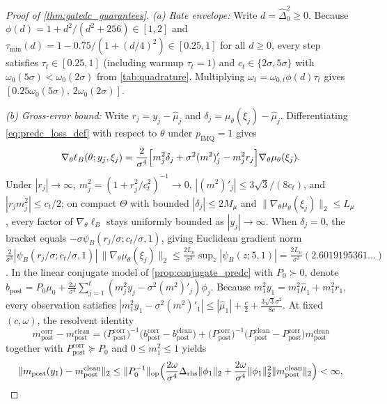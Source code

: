 \documentclass[11pt,a4paper,reqno]{amsart}
\theoremstyle{definition}
\theoremstyle{remark}
\begin{document}
\begin{proof}[Proof of \cref{thm:gatedc_guarantees}]
\emph{(a) Rate envelope:} Write $d = \hat{\Delta}_0^2 \ge 0$. Because $\phi(d) = 1 + d^2/(d^2+256) \in [1, 2]$ and $\tau_{\min}(d) = 1 - 0.75/(1 + (d/4)^2) \in [0.25, 1]$ for all $d \ge 0$, every step satisfies $\tau_t \in [0.25, 1]$ (including warmup $\tau_t=1$) and $c_t \in \{2\sigma, 5\sigma\}$ with $\omega_0(5\sigma) < \omega_0(2\sigma)$ from \cref{tab:quadrature}. Multiplying $\omega_t = \omega_{0,t}\phi(d)\tau_t$ gives $[0.25\omega_0(5\sigma),\, 2\omega_0(2\sigma)]$.

\emph{(b) Gross-error bound:} Write $r_j = y_j - \hat{\mu}_j$ and $\delta_j = \mu_\theta(\xi_j) - \hat{\mu}_j$. Differentiating \eqref{eq:predc_loss_def} with respect to $\theta$ under $p_{\mathrm{IMQ}}=1$ gives
\[
\nabla_\theta \ell_B(\theta; y_j, \xi_j) = \frac{2}{\sigma^4}\Bigl[m_j^2 \delta_j + \sigma^2 (m^2)'_j - m_j^2 r_j\Bigr]\nabla_\theta \mu_\theta(\xi_j).
\]
Under $|r_j| \to \infty$, $m_j^2 = (1 + r_j^2/c_t^2)^{-1} \to 0$, $|(m^2)'_j| \le 3\sqrt{3}/(8 c_t)$, and $|r_j m_j^2| \le c_t / 2$; on compact $\Theta$ with bounded $|\delta_j| \le 2 M_\mu$ and $\|\nabla_\theta\mu_\theta(\xi_j)\|_2 \le L_\mu$, every factor of $\nabla_\theta \ell_B$ stays uniformly bounded as $|y_j| \to \infty$. When $\delta_j = 0$, the bracket equals $-\sigma\psi_B(r_j/\sigma; c_t/\sigma, 1)$, giving Euclidean gradient norm $\frac{2}{\sigma^3}|\psi_B(r_j/\sigma; c_t/\sigma, 1)|\,\|\nabla_\theta\mu_\theta(\xi_j)\|_2 \le \frac{2 L_\mu}{\sigma^3}\sup_z|\psi_B(z; 5, 1)| = \frac{2 L_\mu}{\sigma^3}(2.6019195361\dots)$. In the linear conjugate model of \cref{prop:conjugate_predc} with $P_0 \succ 0$, denote $b_{\mathrm{post}} = P_0\mu_0 + \frac{2\omega}{\sigma^4}\sum_{j=1}^t (m_j^2 y_j - \sigma^2 (m^2)'_j)\phi_j$. Because $m_1^2 y_1 = m_1^2 \hat{\mu}_1 + m_1^2 r_1$, every observation satisfies $|m_1^2 y_1 - \sigma^2 (m^2)'_1| \le |\hat{\mu}_1| + \frac{c}{2} + \frac{3\sqrt{3}\sigma^2}{8c}$. At fixed $(c, \omega)$, the resolvent identity
\[
m_{\mathrm{post}}^{\mathrm{corr}} - m_{\mathrm{post}}^{\mathrm{clean}}
= \bigl(P_{\mathrm{post}}^{\mathrm{corr}}\bigr)^{-1}\bigl(b_{\mathrm{post}}^{\mathrm{corr}} - b_{\mathrm{post}}^{\mathrm{clean}}\bigr)
+ \bigl(P_{\mathrm{post}}^{\mathrm{corr}}\bigr)^{-1}\bigl(P_{\mathrm{post}}^{\mathrm{clean}} - P_{\mathrm{post}}^{\mathrm{corr}}\bigr)m_{\mathrm{post}}^{\mathrm{clean}}
\]
together with $P_{\mathrm{post}}^{\mathrm{corr}} \succeq P_0$ and $0 \le m_1^2 \le 1$ yields
\[
\|m_{\mathrm{post}}(y_1) - m_{\mathrm{post}}^{\mathrm{clean}}\|_2 \le \|P_0^{-1}\|_{\mathrm{op}}\Bigl(\frac{2\omega}{\sigma^4}\Delta_{\mathrm{rhs}}\|\phi_1\|_2 + \frac{2\omega}{\sigma^4}\|\phi_1\|_2^2 \|m_{\mathrm{post}}^{\mathrm{clean}}\|_2\Bigr) < \infty,
\]
\end{proof}
\end{document}

